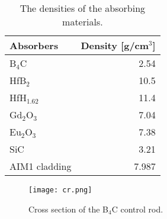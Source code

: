 \begin{table}
	\caption{The densities of the absorbing materials.}
	\vspace{0.05in}
	\begin{center}	
		\begin{tabular}{|l | r|}  %
			\hline
			Absorbers & Density [g/cm$^3$]\\
			\hline
			B$_4$C   &  2.54 \\
			HfB$_2$   &  10.5 \\
			HfH$_{1.62}$  &  11.4 \\
			Gd$_2$O$_3$   &  7.04 \\
			Eu$_2$O$_3$  &  7.38 \\
			SiC   & 3.21 \\
			AIM1 cladding   & 7.987 \\
			\hline
		\end{tabular}
		\label{tab:table111}
	\end{center}
\end{table}

%
%
%
%
%

\begin{figure}[t!]  %
	\centering
	\hspace{+0.65in} 
	\texttt{[image: cr.png]}
	\caption{Cross section of the B$_4$C control rod.}
	\label{fig:cr}
\end{figure}

